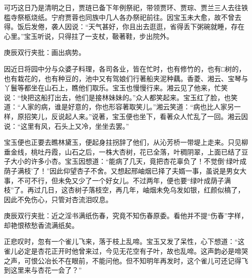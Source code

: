 \begin{parag}
    可巧这日乃是清明之日，贾琏已备下年例祭祀，带领贾环、贾琮、贾兰三人去往铁槛寺祭柩烧纸。宁府贾蓉也同族中几人各办祭祀前往。因宝玉未大愈，故不曾去得。饭后发倦，袭人因说：“天气甚好，你且出去逛逛，省得丢下粥碗就睡，存在心里。”宝玉听说，只得拄了一支杖，靸著鞋，步出院外。\begin{note}庚辰双行夹批：画出病势。\end{note}因近日将园中分与众婆子料理，各司各业，皆在忙时，也有修竹的，也有□树的，也有栽花的，也有种豆的，池中又有驾娘们行著船夹泥种藕。香菱、湘云、宝琴与丫鬟等都坐在山石上，瞧他们取乐。宝玉也慢慢行来。湘云见了他来，忙笑说：“快把这船打出去，他们是接林妹妹的。”众人都笑起来。宝玉红了脸，也笑道：“人家的病，谁是好意的，你也形容著取笑儿。”湘云笑道：“病也比人家另一样，原招笑儿，反说起人来。”说著，宝玉便也坐下，看著众人忙乱了一回。湘云因说：“这里有风，石头上又冷，坐坐去罢。”
\end{parag}


\begin{parag}
    宝玉便也正要去瞧林黛玉，便起身拄拐辞了他们，从沁芳桥一带堤上走来。只见柳垂金线，桃吐丹霞，山石之后，一株大杏树，花已全落，叶稠阴翠，上面已结了豆子大小的许多小杏。宝玉因想道：“能病了几天，竟把杏花辜负了！不觉倒‘绿叶成荫子满枝’了！”因此仰望杏子不舍。又想起邢岫烟已择了夫婿一事，虽说是男女大事，不可不行，但未免又少了一个好女儿。不过两年，便也要“绿叶成荫子满枝”了。再过几日，这杏树子落枝空，再几年，岫烟未免乌发如银，红颜似槁了，因此不免伤心，只管对杏流泪叹息。\begin{note}庚辰双行夹批：近之淫书满纸伤春，究竟不知伤春原委。看他并不提“伤春”字样，却艳恨秾愁香流满纸矣。\end{note}正悲叹时，忽有一个雀儿飞来，落于枝上乱啼。宝玉又发了呆性，心下想道：“这雀儿必定是杏花正开时他曾来过，今见无花空有子叶，故也乱啼。这声韵必是啼哭之声，可恨公冶长不在眼前，不能问他。但不知明年再发时，这个雀儿可还记得飞到这里来与杏花一会了？”
\end{parag}


